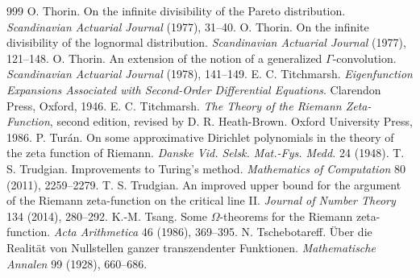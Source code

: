 \begin{thebibliography}{999}
 O. Thorin. On the infinite divisibility of the Pareto distribution. \emph{Scandinavian Actuarial Journal} (1977), 31--40.
 O. Thorin. On the infinite divisibility of the lognormal distribution. \emph{Scandinavian Actuarial Journal} (1977), 121--148.
 O. Thorin. An extension of the notion of a generalized $\Gamma$-convolution. \emph{Scandinavian Actuarial Journal} (1978), 141--149.
 E. C. Titchmarsh. \emph{Eigenfunction Expansions Associated with Second-Order Differential Equations}. Clarendon Press, Oxford, 1946.
 E. C. Titchmarsh. \emph{The Theory of the Riemann Zeta-Function}, second edition, revised by D. R. Heath-Brown. Oxford University Press, 1986.
 P. Tur\'an. On some approximative Dirichlet polynomials in the theory of the zeta function of Riemann. \emph{Danske Vid. Selsk. Mat.-Fys. Medd.} 24 (1948).
 T. S. Trudgian. Improvements to Turing's method. \emph{Mathematics of Computation} 80 (2011), 2259--2279.
 T. S. Trudgian. An improved upper bound for the argument of the Riemann zeta-function on the critical line II. \emph{Journal of Number Theory} 134 (2014), 280--292.
 K.-M. Tsang. Some $\Omega$-theorems for the Riemann zeta-function. \emph{Acta Arithmetica} 46 (1986), 369--395.
 N. Tschebotareff. \"Uber die Realit\"at von Nullstellen ganzer transzendenter Funktionen. \emph{Mathematische Annalen} 99 (1928), 660--686.

\end{thebibliography}

